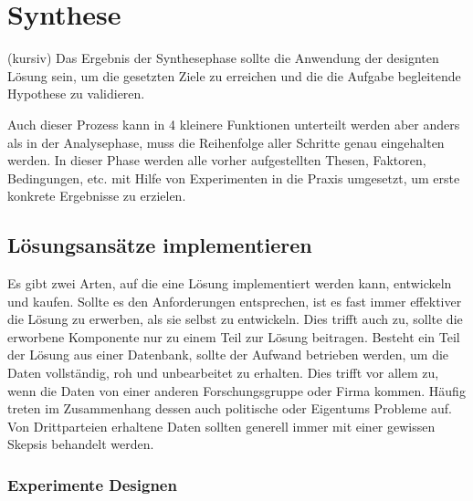 \section{Synthese}

(kursiv)
Das Ergebnis der Synthesephase sollte die Anwendung der designten Lösung sein, um die gesetzten Ziele 
zu erreichen und die die Aufgabe begleitende Hypothese zu validieren.

Auch dieser Prozess kann in 4 kleinere Funktionen unterteilt werden aber anders als in der 
Analysephase, muss die Reihenfolge aller Schritte genau eingehalten werden. In dieser Phase werden 
alle vorher aufgestellten Thesen, Faktoren, Bedingungen, etc. mit Hilfe von Experimenten in die 
Praxis umgesetzt, um erste konkrete Ergebnisse zu erzielen.

    \subsection{Lösungsansätze implementieren}

    Es gibt zwei Arten, auf die eine Lösung implementiert werden kann, entwickeln und kaufen. 
    Sollte es den Anforderungen entsprechen, ist es fast immer effektiver die Lösung zu erwerben, 
    als sie selbst zu entwickeln. Dies trifft auch zu, sollte die erworbene Komponente nur zu einem 
    Teil zur Lösung beitragen. 
    Besteht ein Teil der Lösung aus einer Datenbank, sollte der Aufwand betrieben werden, um die Daten 
    vollständig, roh und unbearbeitet zu erhalten. Dies trifft vor allem zu, wenn die Daten von einer 
    anderen Forschungsgruppe oder Firma kommen. Häufig treten im Zusammenhang dessen auch politische 
    oder Eigentums Probleme auf. Von Drittparteien erhaltene Daten sollten generell immer mit einer 
    gewissen Skepsis behandelt werden.

    \subsubsection{Experimente Designen}

